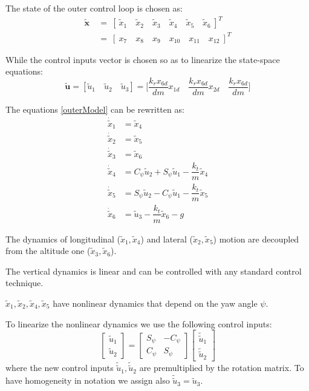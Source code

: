 \documentclass[11pt,a4paper]{scrartcl}
\begin{document}
The state of the outer control loop is chosen as:
\begin{align*}
\mathbf{\tilde{x}} \ &= \ [ \ \tilde{x}_1 \quad \tilde{x}_2 \quad \tilde{x}_3 \quad \tilde{x}_4 \quad \tilde{x}_5 \quad \tilde{x}_6 \ ]^T \\
&= \ [ \ x_7 \quad x_8 \quad x_9 \quad x_{10} \quad x_{11} \quad x_{12} \ ]^T
\end{align*}

While the control inputs vector is chosen so as to linearize the state-space equations:
\begin{equation}
	\mathbf{\tilde{u}} = [\tilde{u}_1 \quad \tilde{u}_2 \quad \tilde{u}_3] = \Big[ \dfrac{k_r x_{6d}}{dm}  x_{1d} \quad  \dfrac{k_r x_{6d} }{dm} x_{2d} \quad  \dfrac{k_r x_{6d}}{dm} \Big]
	\label{OuterInputs}
\end{equation}

The equations \eqref{outerModel} can be rewritten as:
\begin{subequations}
	\begin{align}
		 \dot{\tilde{x}}_1 & = \tilde{x}_4 \\
		 \dot{\tilde{x}}_2 & = \tilde{x}_5 \\
		 \dot{\tilde{x}}_3 & = \tilde{x}_6 \\
		 \dot{\tilde{x}}_4 & = C_\psi \tilde{u}_2 + S_\psi \tilde{u}_1 - \dfrac{k_t}{m} \tilde{x}_4 \\
		 \dot{\tilde{x}}_5 & = S_\psi \tilde{u}_2 - C_\psi \tilde{u}_1 - \dfrac{k_t}{m} \tilde{x}_5 \\
		 \dot{\tilde{x}}_6 & = \tilde{u}_3 - \dfrac{k_t}{m} \tilde{x}_6 - g
	\end{align}
	\label{outerControl_}
\end{subequations}

The dynamics of longitudinal ($ \tilde{x}_1, \tilde{x}_4 $) and lateral ($ \tilde{x}_2, \tilde{x}_5 $) motion are decoupled from the altitude one ($ \tilde{x}_3,  \tilde{x}_6 $).

The vertical dynamics is linear and can be controlled with any standard control technique. 

$ \tilde{x}_1, \tilde{x}_2, \tilde{x}_4, \tilde{x}_5 $ have nonlinear dynamics that depend on the yaw angle $ \psi $.

To linearize the nonlinear dynamics we use the following control inputs:
\begin{equation}
	\begin{bmatrix}
	\tilde{u}_1 \\ \tilde{u}_2
	\end{bmatrix} = 
	\begin{bmatrix}
	S_{\psi} & -C_{\psi} \\
	C_{\psi} & S_{\psi} 
	\end{bmatrix}
	\begin{bmatrix}
	\tilde{\tilde{u}}_1 \\ \tilde{\tilde{u}}_2
	\end{bmatrix}
	\label{rotation_matrix_outer}
\end{equation}
where the new control inputs $ \tilde{\tilde{u}}_1, \tilde{\tilde{u}}_2 $ are premultiplied by the rotation matrix. To have homogeneity in notation we assign also $ \tilde{\tilde{u}}_3 = \tilde{u}_3 $.
\end{document}
